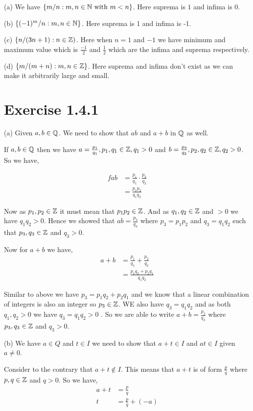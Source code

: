 \documentclass[a4paper]{report}
\begin{document}
(a) We have $\{m/n: m,n \in \mathbb{N} \text{ with } m < n\}$. Here suprema is $1$ and  infima is 0.

(b) $\{(-1)^{m} /n : m, n \in \mathbb{N}\}$. Here suprema is 1 and infima is -1.

(c) $\{n / (3n + 1): n \in \mathbb{Z})$. Here when $n = 1$  and $-1$ we have minimum and maximum value which is  $\frac{-1}{2}$  and $\frac{1}{2}$ which are the infima and suprema respectively.

(d) $\{m / (m + n): m,n \in \mathbb{Z}\}$. Here suprema and infima don't exist as we can make it arbitrarily large and small.

\section*{Exercise 1.4.1}
(a) Given $a, b \in \mathbb{Q}$. We need to show that  $ab $ and  $a + b$ in  $\mathbb{Q}$ as well. 

If  $a, b \in \mathbb{Q}$ then we  have  $a = \frac{p_1}{q_1}, p_1,q_1 \in \mathbb{Z}, q_1 > 0$ and $b = \frac{p_2}{q_2}, p_2,q_2 \in  \mathbb{Z}, q_2 > 0$. So we have,


\begin{align*}f
    ab &= \frac{p_1}{q_1} \cdot \frac{p_2}{q_2}\\
    &= \frac{p_1p_2}{q_1q_2}
\end{align*}

Now as $p_1,p_2 \in \mathbb{Z} $ it must mean that $p_1p_2 \in \mathbb{Z}$. And as $q_1,q_2 \in \mathbb{Z}$ and $> 0$ we have $q_1q_2 > 0$. Hence we showed that $ab = \frac{p_3}{q_3}$ where $p_3 = p_1p_2$  and $q_3 = q_1q_2$ such that $p_3,q_3 \in \mathbb{Z}$ and $q_3 > 0$.

Now for $a + b$ we have, 
\begin{align*}
    a + b &= \frac{p_1}{q_1}  + \frac{p_2}{q_2}\\
          &= \frac{p_1q_2 + p_2q_1}{q_1q_2}
\end{align*}

Similar to above we have $p_3 = p_1q_2 + p_2q_1$ and  we know that a linear combination of integers is also an integer so $p_3 \in \mathbb{Z}$. WE also have $q_3 = q_1q_2$ and as both $q_1,q_2 > 0$ we have $q_3 = q_1q_2 > 0$ . So we are able to write $a + b = \frac{p_3}{q_3}$ where $p_3,q_3 \in \mathbb{Z}$ and $q_3 > 0$.


(b) We have $a \in Q$ and  $t \in I$ we need to show that $a + t \in I$ and $at \in I$ given $a \ne 0$.

Consider to the contrary that $a + t \not \in I$. This means that $a + t$ is of form $\frac{p}{q}$ where $p,q \in \mathbb{Z}$ and $ q > 0$. So we have, 
\begin{align*}
    a + t &= \frac{p}{q} \\
    t &= \frac{p}{q}  + (-a)
\end{align*}
\end{document}
